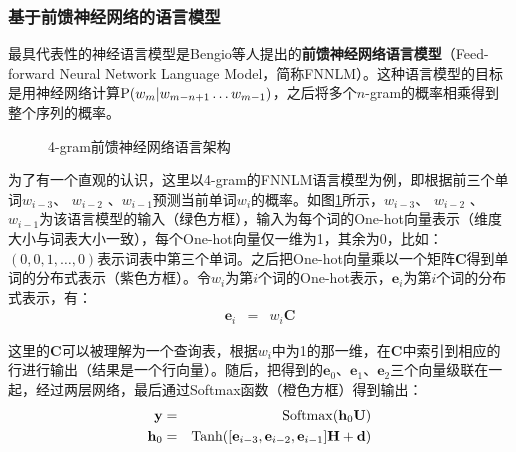 
\subsubsection{基于前馈神经网络的语言模型}

\parinterval  最具代表性的神经语言模型是Bengio等人提出的{\small\sffamily\bfseries{前馈神经网络语言模型}}（Feed-forward Neural Network Language Model，简称FNNLM）。这种语言模型的目标是用神经网络计算$ {\rm P}(w_m|w_{m-n+1}\dots w_{m-1}) $，之后将多个$n$-gram的概率相乘得到整个序列的概率\cite{bengio2003neural}。

\begin{figure}[htp]
\centering

\caption{4-gram前馈神经网络语言架构}
\label{fig:5-60}
\end{figure}

\parinterval  为了有一个直观的认识，这里以4-gram的FNNLM语言模型为例，即根据前三个单词$ w_{i-3} $、 $ w_{i-2} $ 、$ w_{i-1} $预测当前单词$ w_i $的概率。如图\ref{fig:5-60}所示，$ w_{i-3} $、 $ w_{i-2} $ 、$ w_{i-1} $为该语言模型的输入（绿色方框），输入为每个词的One-hot向量表示（维度大小与词表大小一致），每个One-hot向量仅一维为1，其余为0，比如：$ (0,0,1,\dots,0) $表示词表中第三个单词。之后把One-hot向量乘以一个矩阵$ \mathbf C $得到单词的分布式表示（紫色方框）。令$ w_i $为第$ i $个词的One-hot表示，$ \mathbf e_i $为第$ i $个词的分布式表示，有：
\begin{eqnarray}
\mathbf e_i&=&w_i\mathbf C
\label{eq:5-60}
\end{eqnarray}

\noindent  这里的$ \mathbf C $可以被理解为一个查询表，根据$ w_i $中为1的那一维，在$ \mathbf C $中索引到相应的行进行输出（结果是一个行向量）。随后，把得到的$ \mathbf e_0 $、$ \mathbf e_1 $、$ \mathbf e_2 $三个向量级联在一起，经过两层网络，最后通过Softmax函数（橙色方框）得到输出：
\begin{eqnarray}
\mathbf y&=&{\rm{Softmax}}(\mathbf h_0\mathbf U)\label{eq:5-61}\\
\mathbf h_0&=&{\rm{Tanh}}([\mathbf e_{i-3},\mathbf e_{i-2},\mathbf e_{i-1}]\mathbf H+\mathbf d)
\label{eq:5-62}
\end{eqnarray}

